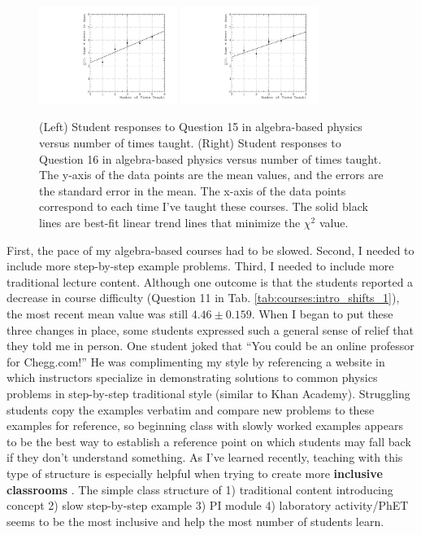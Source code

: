 \documentclass[../../main.tex]{subfiles}
\begin{document}
\begin{figure}[hb]
\centering
\includegraphics[width=0.4\textwidth]{Q15_algebra_based.pdf}
\includegraphics[width=0.4\textwidth]{Q16_algebra_based.pdf}
\caption{\label{fig:courses:intro_q15}  (Left) Student responses to Question 15 in algebra-based physics versus number of times taught. (Right) Student responses to Question 16 in algebra-based physics versus number of times taught.  The y-axis of the data points are the mean values, and the errors are the standard error in the mean.  The x-axis of the data points correspond to each time I've taught these courses.  The solid black lines are best-fit linear trend lines that minimize the $\chi^2$ value.}
\end{figure}

First, the pace of my algebra-based courses had to be slowed.  Second, I needed to include more step-by-step example problems.  Third, I needed to include more traditional lecture content.  Although one outcome is that the students reported a decrease in course difficulty (Question 11 in Tab. \ref{tab:courses:intro_shifts_1}), the most recent mean value was still $4.46 \pm 0.159$.  When I began to put these three changes in place, some students expressed such a general sense of relief that they told me in person.  One student joked that ``You could be an online professor for Chegg.com!'' He was complimenting my style by referencing a website in which instructors specialize in demonstrating solutions to common physics problems in step-by-step traditional style (similar to Khan Academy).  Struggling students copy the examples verbatim and compare new problems to these examples for reference, so beginning class with slowly worked examples appears to be the best way to establish a reference point on which students may fall back if they don't understand something.  As I've learned recently, teaching with this type of structure is especially helpful when trying to create more \textbf{inclusive classrooms} \cite{inclusive}. The simple class structure of 1) traditional content introducing concept 2) slow step-by-step example 3) PI module 4) laboratory activity/PhET seems to be the most inclusive and help the most number of students learn.  \\ \hspace{0.1cm}
\end{document}
